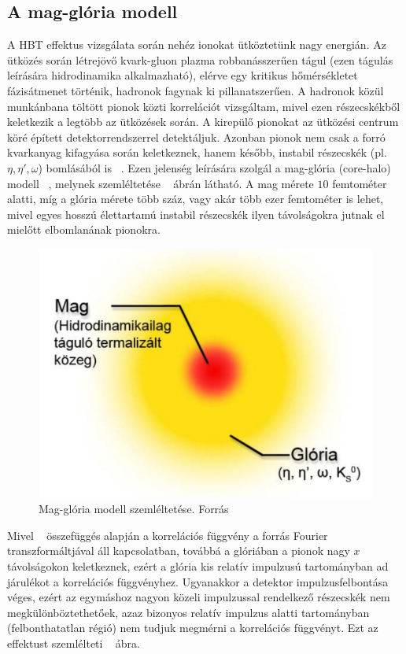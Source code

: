 \documentclass[11pt,a4paper]{article}
\numberwithin{equation}{subsection}
\numberwithin{figure}{section}
\begin{document}
\subsection{A mag-glória modell}
A HBT effektus vizsgálata során nehéz ionokat ütköztetünk nagy energián. Az ütközés során létrejövő kvark-gluon plazma robbanásszerűen tágul (ezen tágulás leírására hidrodinamika alkalmazható), elérve egy kritikus hőmérsékletet fázisátmenet történik, hadronok fagynak ki pillanatszerűen. A hadronok közül munkánbana  töltött pionok közti korrelációt vizsgáltam, mivel ezen részecskékből keletkezik a legtöbb az ütközések során. A kirepülő pionokat az ütközési centrum köré épített detektorrendszerrel detektáljuk. Azonban pionok nem csak a forró kvarkanyag kifagyása során  keletkeznek, hanem később, instabil részecskék (pl. $\eta,\eta',\omega$) bomlásából is ~\cite{Bolz:1992hc}. Ezen jelenség leírására szolgál a mag-glória (core-halo) modell ~\cite{Csorgo:1994in,Csorgo:1999sj}, melynek szemléltetése ~ ábrán látható. A mag mérete $10$ femtométer alatti, míg a glória mérete több száz, vagy akár több ezer femtométer is lehet, mivel egyes hosszú élettartamú instabil részecskék ilyen távolságokra jutnak el mielőtt elbomlanának pionokra.
\begin{figure}[H]
\centering
\includegraphics[scale=0.5]{pic/BEintro/CH1}
\caption{Mag-glória modell szemléltetése. Forrás \cite{Kofarago}}
\label{fig:ch1}
\end{figure}

Mivel ~ összefüggés alapján a korrelációs függvény a forrás Fourier transzformáltjával áll kapcsolatban, továbbá a glóriában a pionok nagy $x$ távolságokon keletkeznek, ezért a glória  kis relatív impulzusú tartományban ad járulékot a korrelációs függvényhez. Ugyanakkor a detektor impulzusfelbontása véges, ezért az egymáshoz nagyon közeli impulzussal rendelkező részecskék nem megkülönböztethetőek, azaz bizonyos relatív impulzus alatti tartományban (felbonthatatlan régió) nem tudjuk megmérni a korrelációs függvényt. Ezt az effektust szemlélteti ~ ábra.
\end{document}
